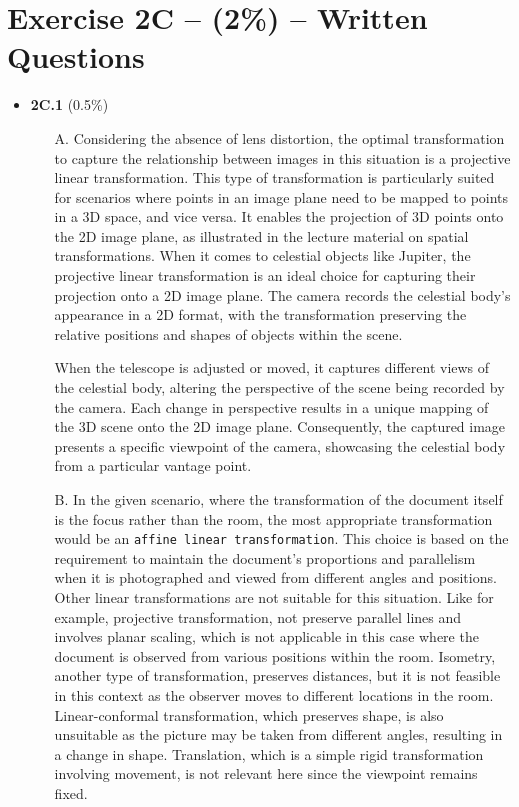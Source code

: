 \documentclass{article}
\begin{document}
	
	\vspace{0.5cm}
	\clearpage
	\newpage
	\section*{Exercise 2C -- (2\%) -- Written Questions }
	

	\begin{itemize}
		\item{\textbf{2C.1} (0.5\%)}
			{
				\begin{itemize}
					\item[A.] 
						Considering the absence of lens distortion, the optimal transformation to capture the relationship between images in this situation is a projective linear transformation. This type of transformation is 
						particularly suited for scenarios where points in an image plane need to be mapped to points in a 3D space, and vice versa. It enables the projection of 3D points onto the 2D image plane, as illustrated in 
						the lecture material on spatial transformations. When it comes to celestial objects like Jupiter, the projective linear transformation is an ideal choice for 
						capturing their projection onto a 2D image plane. The camera records the celestial body's appearance in a 2D format, with the transformation preserving the relative positions and shapes 
						of objects within the scene.

						When the telescope is adjusted or moved, it captures different views of the celestial body, altering the perspective of the scene being recorded by the camera. Each change in 
						perspective results in a unique mapping of the 3D scene onto the 2D image plane. Consequently, the captured image presents a specific viewpoint of the camera, showcasing the celestial body from a 
						particular vantage point.

					\item[B.]
						In the given scenario, where the transformation of the document itself is the focus rather than the room, the most appropriate transformation would be an {\texttt{affine linear transformation}}. 
						This choice is based on the requirement to maintain the document's proportions and parallelism when it is photographed and viewed from different angles and positions. Other linear transformations 
						are not suitable for this situation. Like for example, projective transformation, not preserve parallel lines and involves planar scaling, which is not applicable in this case where the document 
						is observed from various positions within the room. Isometry, another type of transformation, preserves distances, but it is not feasible in this context as the observer moves to different locations in the room. 
						Linear-conformal transformation, which preserves shape, is also unsuitable as the picture may be taken from different angles, resulting in a change in shape. Translation, which is a simple rigid transformation 
						involving movement, is not relevant here since the viewpoint remains fixed.


\end{itemize}}
\end{itemize}
\end{document}
